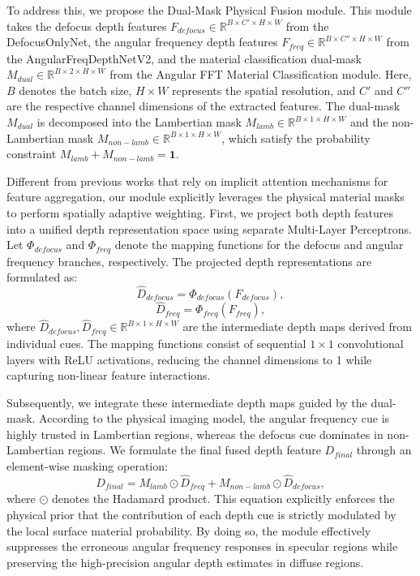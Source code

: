\documentclass[lettersize,journal]{IEEEtran}
\begin{document}
To address this, we propose the Dual-Mask Physical Fusion module. This module takes the defocus depth features $F_{defocus} \in \mathbb{R}^{B \times C' \times H \times W}$ from the DefocusOnlyNet, the angular frequency depth features $F_{freq} \in \mathbb{R}^{B \times C'' \times H \times W}$ from the AngularFreqDepthNetV2, and the material classification dual-mask $M_{dual} \in \mathbb{R}^{B \times 2 \times H \times W}$ from the Angular FFT Material Classification module. Here, $B$ denotes the batch size, $H \times W$ represents the spatial resolution, and $C'$ and $C''$ are the respective channel dimensions of the extracted features. The dual-mask $M_{dual}$ is decomposed into the Lambertian mask $M_{lamb} \in \mathbb{R}^{B \times 1 \times H \times W}$ and the non-Lambertian mask $M_{non-lamb} \in \mathbb{R}^{B \times 1 \times H \times W}$, which satisfy the probability constraint $M_{lamb} + M_{non-lamb} = \mathbf{1}$.

Different from previous works that rely on implicit attention mechanisms for feature aggregation, our module explicitly leverages the physical material masks to perform spatially adaptive weighting. First, we project both depth features into a unified depth representation space using separate Multi-Layer Perceptrons. Let $\Phi_{defocus}$ and $\Phi_{freq}$ denote the mapping functions for the defocus and angular frequency branches, respectively. The projected depth representations are formulated as:
\begin{equation}
\label{eq:eq8}
\hat{D}_{defocus} = \Phi_{defocus}(F_{defocus}),
\end{equation}
\begin{equation}
\label{eq:eq9}
\hat{D}_{freq} = \Phi_{freq}(F_{freq}),
\end{equation}
where $\hat{D}_{defocus}, \hat{D}_{freq} \in \mathbb{R}^{B \times 1 \times H \times W}$ are the intermediate depth maps derived from individual cues. The mapping functions consist of sequential $1 \times 1$ convolutional layers with ReLU activations, reducing the channel dimensions to 1 while capturing non-linear feature interactions.

Subsequently, we integrate these intermediate depth maps guided by the dual-mask. According to the physical imaging model, the angular frequency cue is highly trusted in Lambertian regions, whereas the defocus cue dominates in non-Lambertian regions. We formulate the final fused depth feature $D_{final}$ through an element-wise masking operation:
\begin{equation}
\label{eq:eq10}
D_{final} = M_{lamb} \odot \hat{D}_{freq} + M_{non-lamb} \odot \hat{D}_{defocus},
\end{equation}
where $\odot$ denotes the Hadamard product. This equation explicitly enforces the physical prior that the contribution of each depth cue is strictly modulated by the local surface material probability. By doing so, the module effectively suppresses the erroneous angular frequency responses in specular regions while preserving the high-precision angular depth estimates in diffuse regions.
\end{document}
